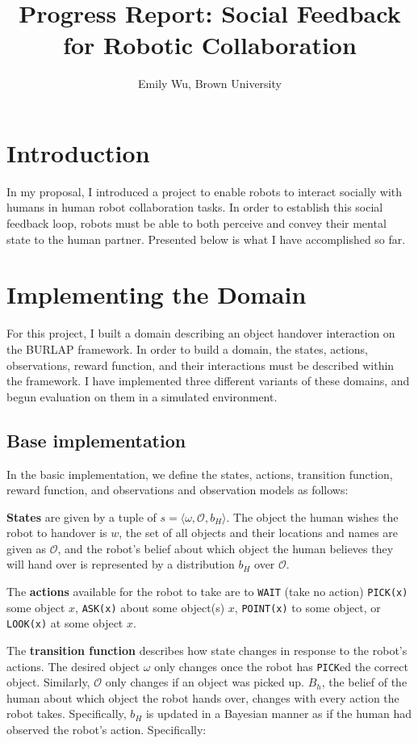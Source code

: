 \documentclass{article}
\title{Progress Report: Social Feedback for Robotic Collaboration}
\author{Emily Wu, Brown University}
\begin{document}
\maketitle

\section{Introduction} 

In my proposal, I introduced a project to enable robots to interact socially with humans in human robot collaboration tasks. In order to establish this social feedback loop, robots must be able to both perceive and convey their mental state to the human partner. Presented below is what I have accomplished so far. 

\section{Implementing the Domain}

For this project, I built a domain describing an object handover interaction on the BURLAP framework. In order to build a domain, the states, actions, observations, reward function, and their interactions must be described within the framework. I have implemented three different variants of these domains, and begun evaluation on them in a simulated environment. 

\subsection{Base implementation}

In the basic implementation, we define the states, actions, transition function, reward function, and observations and observation models as follows: 

\textbf{States} are given by a tuple of $ s = \langle \omega, \mathcal{O}, b_H \rangle$. The object the human wishes the robot to handover is $w$, the set of all objects and their locations and names are given as $\mathcal{O}$, and the robot's belief about which object the human believes they will hand over is represented by a distribution $b_H$ over $\mathcal{O}$. 

The \textbf{actions} available for the robot to take are to \texttt{WAIT} (take no action) \texttt{PICK(x)} some object $x$, \texttt{ASK(x)} about some object(s) $x$, \texttt{POINT(x)} to some object, or \texttt{LOOK(x)} at some object $x$. 

The \textbf{transition function} describes how state changes in response to the robot's actions. The desired object $\omega$ only changes once the robot has \texttt{PICK}ed the correct object. Similarly, $\mathcal{O}$ only changes if an object was picked up. $B_h$, the belief of the human about which object the robot hands over, changes with every action the robot takes. Specifically, $b_H$ is updated in a Bayesian manner as if the human had observed the robot's action. Specifically: 
\end{document}
